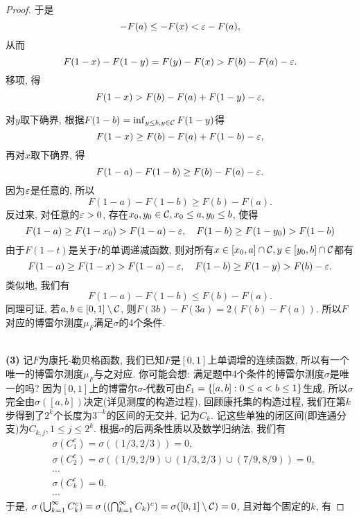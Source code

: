 \begin{proof}
{    于是$$ -F(a) \leq -F(x) < \varepsilon - F(a), $$
    从而
    $$F(1-x)-F(1-y) = F(y)-F(x) > F(b)-F(a)-\varepsilon. $$
    移项, 得
    $$F(1-x) > F(b)-F(a) + F(1-y) - \varepsilon, $$
    
    对$y$取下确界, 根据$F(1-b) = \inf_{y \leq b, y \in \mathcal{C}}F(1-y)$得
    $$F(1-x) \geq F(b)-F(a) + F(1-b) - \varepsilon, $$ 再对$x$取下确界, 得
    $$F(1-a) - F(1-b) \geq F(b)-F(a)-\varepsilon. $$ 因为$\varepsilon$是任意的, 所以
    $$F(1-a) - F(1-b) \geq F(b) - F(a). $$
    反过来, 对任意的$\varepsilon > 0$, 存在$x_0, y_0 \in \mathcal{C}, x_0 \leq a, y_0 \leq b$, 使得
    $$F(1-a) \geq F(1-x_0) > F(1-a) - \varepsilon, \quad F(1-b) \geq F(1-y_0) > F(1-b) $$
    由于$F(1-t)$是关于$t$的单调递减函数, 则对所有$x \in [x_0,a] \cap \mathcal{C}, y \in [y_0, b] \cap \mathcal{C}$都有
    $$F(1-a) \geq F(1-x) > F(1-a)-\varepsilon, \quad F(1-b) \geq F(1-y) > F(b)-\varepsilon. $$
    类似地, 我们有
    $$F(1-a)-F(1-b) \leq F(b) - F(a). $$
    同理可证, 若$a,b \in [0,1] \setminus \mathcal{C}$, 则$F(3b)-F(3a) = 2(F(b)-F(a))$.
    所以$F$对应的博雷尔测度$\mu_F$满足$\sigma$的4个条件.} \\
    \textbf{(3)}   
    记$F$为康托-勒贝格函数, 我们已知$F$是$[0,1]$上单调增的连续函数, 所以有一个唯一的博雷尔测度$\mu_F$与之对应.
    你可能会想: 满足题中4个条件的博雷尔测度$\sigma$是唯一的吗? 
    因为$[0,1]$上的博雷尔$\sigma$-代数可由$\mathcal{E}_1 = \{[a,b]: 0 \leq a < b \leq 1 \}$生成, 所以$\sigma$完全由$\sigma([a,b])$决定(详见测度的构造过程),
    回顾康托集的构造过程, 我们在第$k$步得到了$2^k$个长度为$3^{-k}$的区间的无交并, 记为$C_k$. 记这些单独的闭区间(即连通分支)为$C_{k,j}, 1 \leq j \leq 2^k$. 根据$\sigma$的后两条性质以及数学归纳法, 我们有
    \begin{align*}
        &\sigma(C_1^c) = \sigma((1/3, 2/3)) = 0, \\
        &\sigma(C_2^c) = \sigma((1/9, 2/9) \cup (1/3, 2/3) \cup (7/9,8/9)) = 0, \\
        &\cdots \\
        &\sigma(C_k^c) = 0, \\
        &\cdots
    \end{align*}
    于是, $\sigma\left(\bigcup_{k=1}^{\infty}C_k^c\right) = \sigma\left( (\bigcap_{k=1}^{\infty}C_k)^c \right) = \sigma([0,1] \setminus \mathcal{C}) = 0$, 且对每个固定的$k$, 有

\end{proof}
